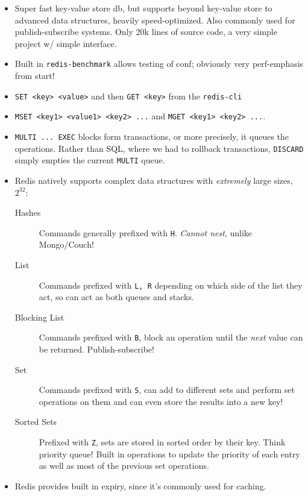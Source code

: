 \documentclass[10pt]{article}
\begin{document}
\begin{itemize}
    \item Super fast key-value store db, but supports beyond key-value store to
        advanced data structures, heavily speed-optimized. Also commonly used
        for publish-subscribe systems. Only 20k lines of source code, a very
        simple project w/ simple interface.
    \item Built in \lstinline{redis-benchmark} allows testing of conf; obviously
        very perf-emphasis from start!
    \item \lstinline{SET <key> <value>} and then \lstinline{GET <key>} from the
        \lstinline{redis-cli}
    \item \lstinline{MSET <key1> <value1> <key2> ...} and
        \lstinline{MGET <key1> <key2> ...}.
    \item \lstinline{MULTI ... EXEC} blocks form transactions, or more
        precisely, it queues the operations. Rather than SQL, where we had to
        rollback transactions, \lstinline{DISCARD} simply empties the current
        \lstinline{MULTI} queue.
    \item Redis natively supports complex data structures with \emph{extremely}
        large sizes, $2^{32}$:
        \begin{description}
            \item[Hashes] Commands generally prefixed with
                \lstinline{H}. \emph{Cannot nest}, unlike Mongo/Couch!
            \item[List] Commands prefixed with \lstinline{L, R} depending on
                which side of the list they act, so can act as both queues and
                stacks.
            \item[Blocking List] Commands prefixed with \lstinline{B}, block an
                operation until the \emph{next} value can be returned.
                Publish-subscribe!
            \item[Set] Commands prefixed with \lstinline{S}, can add to
                different sets and perform set operations on them and can even
                store the results into a new key!
            \item[Sorted Sets] Prefixed with \lstinline{Z}, sets are stored in
                sorted order by their key. Think priority queue! Built in
                operations to update the priority of each entry as well as most
                of the previous set operations.
        \end{description}
    \item Redis provides built in expiry, since it's commonly used for caching.

\end{itemize}
\end{document}
